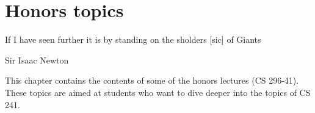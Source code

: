 \chapter{Honors topics}

\epigraph{If I have seen further it is by standing on the sholders [sic] of Giants}{Sir Isaac Newton}

This chapter contains the contents of some of the honors lectures (CS 296-41). These topics are aimed at students who
want to dive deeper into the topics of CS 241.






